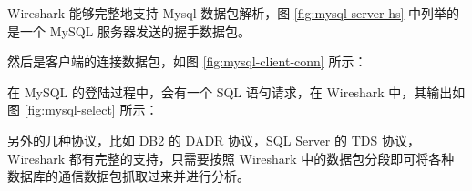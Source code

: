 Wireshark 能够完整地支持 Mysql 数据包解析，图 \ref{fig:mysql-server-hs} 中列举的是一个 MySQL 服务器发送的握手数据包。

然后是客户端的连接数据包，如图 \ref{fig:mysql-client-conn} 所示：

在 MySQL 的登陆过程中，会有一个 SQL 语句请求，在 Wireshark 中，其输出如图 \ref{fig:mysql-select} 所示：

另外的几种协议，比如 DB2 的 DADR 协议，SQL Server 的 TDS 协议，Wireshark 都有完整的支持，只需要按照 Wireshark 中的数据包分段即可将各种数据库的通信数据包抓取过来并进行分析。
